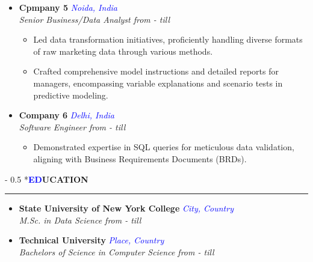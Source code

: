 \documentclass{article}
\makeatletter
\renewcommand{\section}{\@startsection{section}{1}{0mm}%
                                {-\baselineskip}%
                                {0.5\baselineskip}%
                                {\normalfont\small\bfseries}}
\makeatother
\begin{document}
\begin{itemize}[left=0pt]
  \item \textbf{Cpmpany 5} \hfill \textcolor{blue}{\emph{Noida, India}} \\
  \emph{Senior Business/Data Analyst \hfill from - till}
  \begin{itemize}
    \item Led data transformation initiatives, proficiently handling diverse formats of raw marketing data through various methods. 
    \item Crafted comprehensive model instructions and detailed reports for managers, encompassing variable explanations and scenario tests in predictive modeling.
  \end{itemize}
\end{itemize}

\begin{itemize}[left=0pt]
  \item \textbf{Company 6} \hfill \textcolor{blue}{\emph{Delhi, India}} \\
  \emph{Software Engineer \hfill from - till}
  \begin{itemize}
    \item Demonstrated expertise in SQL queries for meticulous data validation, aligning with Business Requirements Documents (BRDs).
  \end{itemize}
\end{itemize}

\section*{{\textbf{\textcolor{blue}{ED}}\textbf{\textcolor{darktext}{UCATION}}}}
\hrule
\begin{itemize}[left=0pt]
\item \textbf{State University of New York College} \hfill \textcolor{blue}{\emph{ City, Country}} \\
  \emph{M.Sc. in Data Science \hfill from - till}
\item \textbf{Technical University} \hfill \textcolor{blue}{\emph{Place, Country}} \\
  \emph{Bachelors of Science in Computer Science \hfill from - till}
\end{itemize}

\end{document}

